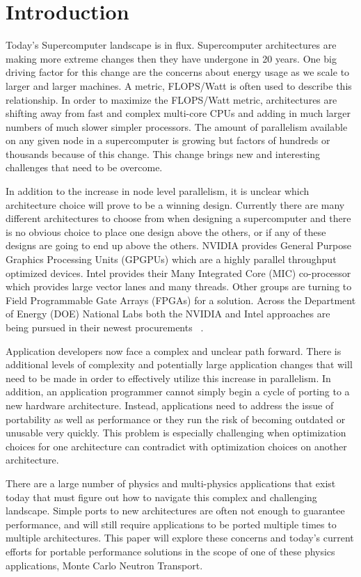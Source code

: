 \section{Introduction}

Today's Supercomputer landscape is in flux.
%
Supercomputer architectures are making more extreme changes then they have undergone in 20 years.
%
One big driving factor for this change are the concerns about energy usage as we scale to larger and larger machines.
%
A metric, FLOPS/Watt is often used to describe this relationship.
%
In order to maximize the FLOPS/Watt metric, architectures are shifting away from fast and complex multi-core CPUs and adding in much larger numbers of much slower simpler processors.
%
The amount of parallelism available on any given node in a supercomputer is growing but factors of hundreds or thousands because of this change.
%
This change brings new and interesting challenges that need to be overcome.
%

%
In addition to the increase in node level parallelism, it is unclear which architecture choice will prove to be a winning design.
%
Currently there are many different architectures to choose from when designing a supercomputer and there is no obvious choice to place one design above the others, or if any of these designs are going to end up above the others.
%
NVIDIA provides General Purpose Graphics Processing Units (GPGPUs) which are a highly parallel throughput optimized devices.
%
Intel provides their Many Integrated Core (MIC) co-processor which provides large vector lanes and many threads.
%
Other groups are turning to Field Programmable Gate Arrays (FPGAs) for a solution.
%
Across the Department of Energy (DOE) National Labs both the NVIDIA and Intel approaches are being pursued in their newest procurements ~\cite{coralWeb, trinityWeb}.
%

Application developers now face a complex and unclear path forward.
%
There is additional levels of complexity and potentially large application changes that will need to be made in order to effectively utilize this increase in parallelism.
%
In addition, an application programmer cannot simply begin a cycle of porting to a new hardware architecture.
%
Instead, applications need to address the issue of portability as well as performance or they run the risk of becoming outdated or unusable very quickly.
%
This problem is especially challenging when optimization choices for one architecture can contradict with optimization choices on another architecture.
%

%
There are a large number of physics and multi-physics applications that exist today that must figure out how to navigate this complex and challenging landscape.
%
Simple ports to new architectures are often not enough to guarantee performance, and will still require applications to be ported multiple times to multiple architectures.
%
This paper will explore these concerns and today's current efforts for portable performance solutions in the scope of one of these physics applications, Monte Carlo Neutron Transport.
%

